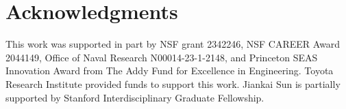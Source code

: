\section*{Acknowledgments}
This work was supported in part by NSF grant 2342246, NSF CAREER Award 2044149, Office of Naval Research N00014-23-1-2148, and Princeton SEAS Innovation Award from The Addy Fund for Excellence in Engineering. Toyota Research Institute provided funds to support this work. Jiankai Sun is partially supported by Stanford Interdisciplinary Graduate Fellowship. 